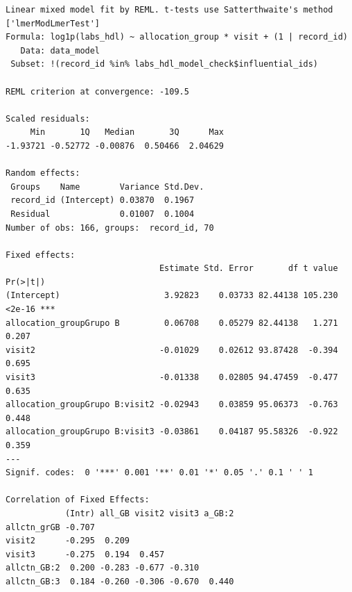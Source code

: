\documentclass[
  12pt,
]{article}
\newenvironment{Shaded}{\begin{snugshade}}{\end{snugshade}}
\newcommand{\NormalTok}[1]{\textcolor[rgb]{0.00,0.23,0.31}{#1}}
\newcommand{\SpecialCharTok}[1]{\textcolor[rgb]{0.37,0.37,0.37}{#1}}
\begin{document}
\begin{verbatim}
Linear mixed model fit by REML. t-tests use Satterthwaite's method ['lmerModLmerTest']
Formula: log1p(labs_hdl) ~ allocation_group * visit + (1 | record_id)
   Data: data_model
 Subset: !(record_id %in% labs_hdl_model_check$influential_ids)

REML criterion at convergence: -109.5

Scaled residuals: 
     Min       1Q   Median       3Q      Max 
-1.93721 -0.52772 -0.00876  0.50466  2.04629 

Random effects:
 Groups    Name        Variance Std.Dev.
 record_id (Intercept) 0.03870  0.1967  
 Residual              0.01007  0.1004  
Number of obs: 166, groups:  record_id, 70

Fixed effects:
                               Estimate Std. Error       df t value Pr(>|t|)    
(Intercept)                     3.92823    0.03733 82.44138 105.230   <2e-16 ***
allocation_groupGrupo B         0.06708    0.05279 82.44138   1.271    0.207    
visit2                         -0.01029    0.02612 93.87428  -0.394    0.695    
visit3                         -0.01338    0.02805 94.47459  -0.477    0.635    
allocation_groupGrupo B:visit2 -0.02943    0.03859 95.06373  -0.763    0.448    
allocation_groupGrupo B:visit3 -0.03861    0.04187 95.58326  -0.922    0.359    
---
Signif. codes:  0 '***' 0.001 '**' 0.01 '*' 0.05 '.' 0.1 ' ' 1

Correlation of Fixed Effects:
            (Intr) all_GB visit2 visit3 a_GB:2
allctn_grGB -0.707                            
visit2      -0.295  0.209                     
visit3      -0.275  0.194  0.457              
allctn_GB:2  0.200 -0.283 -0.677 -0.310       
allctn_GB:3  0.184 -0.260 -0.306 -0.670  0.440
\end{verbatim}

\begin{Shaded}
\end{Shaded}
\end{document}

